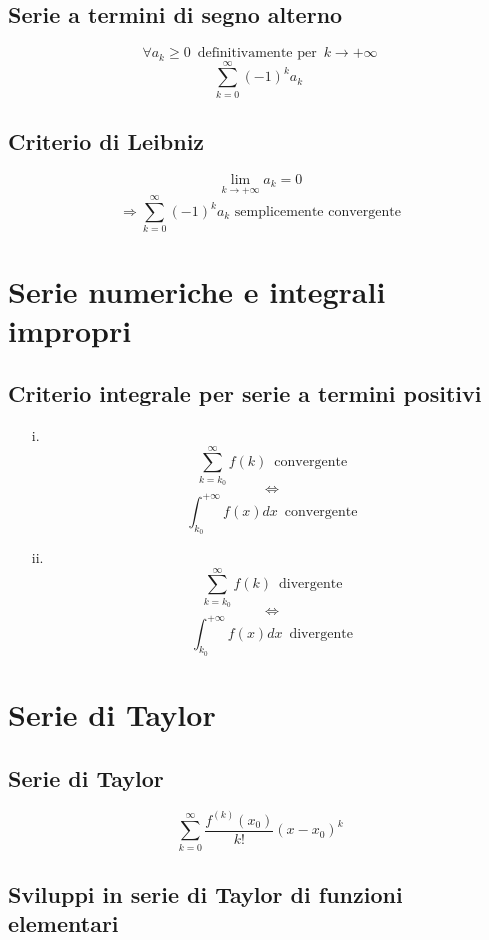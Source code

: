 \documentclass[a4paper,12pt]{report}
\theoremstyle{mystyle}
\begin{document}
\subsection{Serie a termini di segno alterno}
\[\forall a_k \geq 0 \, \text{ definitivamente per } \, k \rightarrow +\infty \]
\[\sum_{k=0}^\infty (-1)^k a_k \ \]


\subsection{Criterio di Leibniz}
\[\lim_{k \rightarrow + \infty} a_k =0 \]
\[\Rightarrow \sum_{k=0}^\infty (-1)^k a_k  \text{ semplicemente convergente}\]




\section{Serie numeriche e integrali impropri}
\subsection{Criterio integrale per serie a termini positivi}
\begin{enumerate}
    \item[i.] \[\sum_{k=k_0}^\infty f(k) \, \text{ convergente} \]
        \[\Leftrightarrow \]
        \[\int_{k_0}^{+\infty} f(x) dx \, \text{ convergente} \]

    \item[ii.] \[\sum_{k=k_0}^\infty f(k) \, \text{ divergente}\]
        \[\Leftrightarrow\]
        \[\int_{k_0}^{+\infty} f(x) dx \, \text{ divergente} \]
\end{enumerate}




\section{Serie di Taylor}

\subsection{Serie di Taylor}
\[\sum_{k=0}^\infty \frac{f^{(k)}(x_0)}{k!}(x-x_0)^k \]


\subsection{Sviluppi in serie di Taylor di funzioni elementari}
\end{document}
